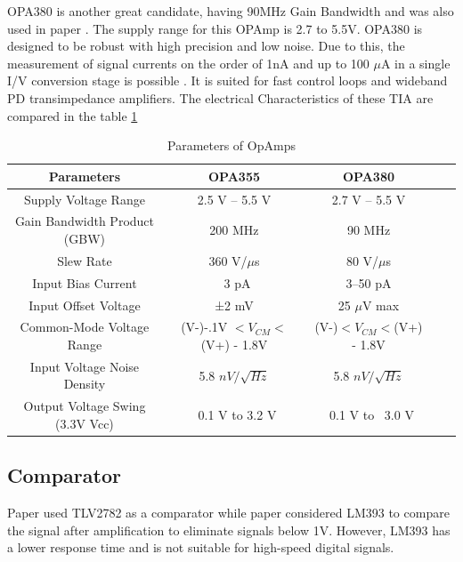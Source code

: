 OPA380 is another great candidate, having 90MHz Gain Bandwidth and was also used in paper \cite{de2024reconfigurable}. The supply range for this \ac{OPAmp} is 2.7 to 5.5V. OPA380 is designed to be robust with high precision and low noise. Due to this, the measurement of signal currents on the order of 1nA and up to 100 \(\mu\)A in a single I/V conversion stage is possible \cite{monitoring_2003}. It is suited for fast control loops and wideband \ac{PD} transimpedance amplifiers. The electrical Characteristics of these \ac{TIA} are compared in the table \ref{tab:4.4}

\begin{table}
    \centering
    \caption{Parameters of OpAmps}
    \begin{tabular}{|c|c|c|c|c|}
         \hline
         \textbf{Parameters} &\textbf{OPA355 } &\textbf{OPA380}
         \\
         \hline
         Supply Voltage Range  &2.5 V – 5.5 V  &2.7 V – 5.5 V\\
         \hline
         Gain Bandwidth Product (GBW)  &200 MHz  &90 MHz\\
         \hline
         Slew Rate  &360 V/\(\mu\)s &80 V/\(\mu\)s  \\
         \hline
         Input Bias Current &~3 pA  &3–50 pA \\
         \hline
         Input Offset Voltage  &±2 mV   &25 \(\mu\)V max\\
         \hline
         Common-Mode Voltage Range &(V-)-.1V  \(<V_{CM} <\) (V+) - 1.8V&(V-)\(<V_{CM} <\)(V+) - 1.8V\\
         \hline
         Input Voltage Noise Density  &5.8 \(nV/\sqrt{Hz}\)  &5.8 \(nV/\sqrt{Hz}\)\\
         \hline
         Output Voltage Swing (3.3V Vcc)  &~0.1 V to 3.2 V   &~0.1 V to ~3.0 V\\
         \hline
    \end{tabular}
    \label{tab:4.4}
\end{table}


\subsection{Comparator}


Paper \cite{6757172} used TLV2782 as a comparator while paper \cite{7420990} considered LM393 to compare the signal after amplification to eliminate signals below 1V. However, LM393 has a lower response time and is not suitable for high-speed digital signals. 

